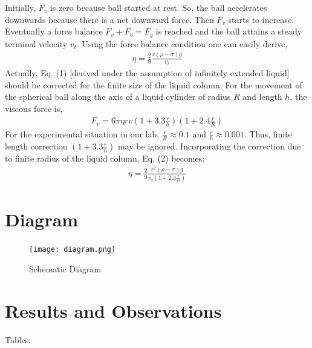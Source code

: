 \documentclass{article}
\begin{document}
	Initially, $F_{v}$ is zero because ball started at rest. So, the ball accelerates downwards because 
	there is a net downward force. Then $F_{v}$ starts to increase. Eventually a force balance 
	$F_{v} + F_{b} = F_{g}$ is reached and the ball attains a steady terminal velocity $v_{t}$. Using the force 
	balance condition one can easily derive,
	\begin{align}
		\eta = \frac{2}{9} \frac{r(\rho - \sigma)g}{v_{t}}
	\end{align}
	Actually, Eq. (1) [derived under the assumption of infinitely extended liquid] should be 
	corrected for the finite size of the liquid column. For the movement of the spherical ball 
	along the axis of a liquid cylinder of radius $R$ and length $h$, the viscous force is,
	\begin{align*}
		F_{v} = 6\pi \eta rv \left(1 + 3.3\frac{r}{h}\right) \left(1 + 2.4 \frac{r}{R}\right)
	\end{align*}
	For the experimental situation in our lab, $\frac{r}{R} \approx 0.1$ and $\frac{r}{h} \approx 0.001$. Thus, finite length correction $\left(1 + 3.3\frac{r}{h}\right)$ may be ignored. Incorporating the correction due to finite radius of the 
	liquid column, Eq. (2) becomes:
	\begin{align}
		\eta = \frac{2}{9} \frac{r^{2} (\rho - \sigma)g}{v_{t} \left(1 + 2.4 \frac{r}{R}\right)}
		\label{equation:tits}
	\end{align}
	\section{Diagram}
	
	\begin{figure}[H]
		\centering
		\texttt{[image: diagram.png]}
		\caption{Schematic Diagram}
	\end{figure}

	\pagebreak
	
	\section{Results and Observations}
	
	Tables:
	
\end{document}
